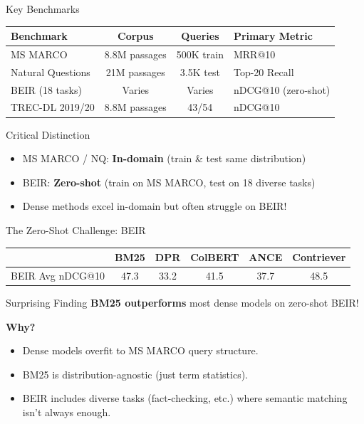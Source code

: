 \documentclass[aspectratio=169]{beamer}
\newif\ifanimated
\newcommand{\cpause}{\ifanimated\pause\fi}
\begin{document}
\begin{frame}{Key Benchmarks}
\begin{table}
\centering
\small
\begin{tabular}{lccl}
\toprule
\textbf{Benchmark} & \textbf{Corpus} & \textbf{Queries} & \textbf{Primary Metric} \\
\midrule
MS MARCO & 8.8M passages & 500K train & MRR@10 \\
Natural Questions & 21M passages & 3.5K test & Top-20 Recall \\
BEIR (18 tasks) & Varies & Varies & nDCG@10 (zero-shot) \\
TREC-DL 2019/20 & 8.8M passages & 43/54 & nDCG@10 \\
\bottomrule
\end{tabular}
\end{table}

\cpause
\vspace{0.5em}

\begin{alertblock}{Critical Distinction}
\begin{itemize}
    \item MS MARCO / NQ: \textbf{In-domain} (train \& test same distribution)
    \item BEIR: \textbf{Zero-shot} (train on MS MARCO, test on 18 diverse tasks)
    \item Dense methods excel in-domain but often struggle on BEIR!
\end{itemize}
\end{alertblock}
\end{frame}

\begin{frame}{The Zero-Shot Challenge: BEIR}
\begin{center}
\begin{tabular}{lccccc}
\toprule
& \textbf{BM25} & \textbf{DPR} & \textbf{ColBERT} & \textbf{ANCE} & \textbf{Contriever} \\
\midrule
BEIR Avg nDCG@10 & 47.3 & 33.2 & 41.5 & 37.7 & 48.5 \\
\bottomrule
\end{tabular}
\end{center}

\vspace{1em}
\cpause

\begin{alertblock}{Surprising Finding}
\textbf{BM25 outperforms} most dense models on zero-shot BEIR!
\end{alertblock}

\textbf{Why?}
\begin{itemize}
    \item Dense models overfit to MS MARCO query structure.
    \item BM25 is distribution-agnostic (just term statistics).
    \item BEIR includes diverse tasks (fact-checking, etc.) where semantic matching isn't always enough.
\end{itemize}
\end{frame}
\end{document}
